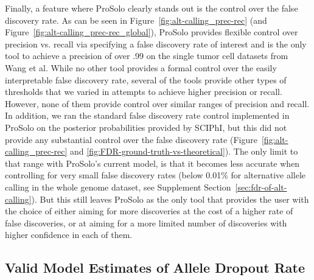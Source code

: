 \documentclass[12pt,inline]{wlscirep}
\begin{document}
Finally, a feature where ProSolo clearly stands out is the control over the false discovery rate.
As can be seen in Figure~\ref{fig:alt-calling_prec-rec} (and Figure~\ref{fig:alt-calling_prec-rec_global}), ProSolo provides flexible control over precision vs. recall via specifying a false discovery rate of interest and is the only tool to achieve a precision of over .99 on the single tumor cell datasets from Wang et al\cite{wang_clonal_2014}.
While no other tool provides a formal control over the easily interpretable false discovery rate, several of the tools provide other types of thresholds that we varied in attempts to achieve higher precision or recall.
However, none of them provide control over similar ranges of precision and recall.
In addition, we ran the standard false discovery rate control implemented in ProSolo on the posterior probabilities provided by SCIPhI, but this did not provide any substantial control over the false discovery rate (Figure~\ref{fig:alt-calling_prec-rec} and \ref{fig:FDR-ground-truth-vs-theoretical}).
The only limit to that range with ProSolo's current model, is that it becomes less accurate when controlling for very small false discovery rates (below 0.01\% for alternative allele calling in the whole genome dataset, see Supplement Section~\ref{sec:fdr-of-alt-calling}).
But this still leaves ProSolo as the only tool that provides the user with the choice of either aiming for more discoveries at the cost of a higher rate of false discoveries, or at aiming for a more limited number of discoveries with higher confidence in each of them.

\subsection*{Valid Model Estimates of Allele Dropout Rate}
\end{document}
